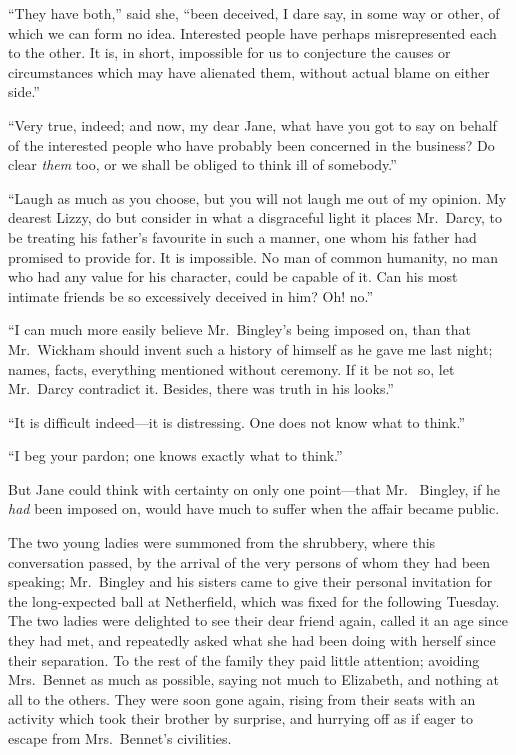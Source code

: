 ``They have both,'' said she, ``been deceived, I dare say, in some
way or other, of which we can form no idea.  Interested people
have perhaps misrepresented each to the other.  It is, in short,
impossible for us to conjecture the causes or circumstances
which may have alienated them, without actual blame on either
side.''

``Very true, indeed; and now, my dear Jane, what have you got
to say on behalf of the interested people who have probably been
concerned in the business?  Do clear \emph{them} too, or we shall be
obliged to think ill of somebody.''

``Laugh as much as you choose, but you will not laugh me out of
my opinion.  My dearest Lizzy, do but consider in what a
disgraceful light it places Mr.\ Darcy, to be treating his father's
favourite in such a manner, one whom his father had promised to
provide for.  It is impossible.  No man of common humanity, no
man who had any value for his character, could be capable of it.
Can his most intimate friends be so excessively deceived in him?
Oh! no.''

``I can much more easily believe Mr.\ Bingley's being imposed on,
than that Mr.\ Wickham should invent such a history of himself
as he gave me last night; names, facts, everything mentioned
without ceremony.  If it be not so, let Mr.\ Darcy contradict it.
Besides, there was truth in his looks.''

``It is difficult indeed---it is distressing.  One does not know what
to think.''

``I beg your pardon; one knows exactly what to think.''

But Jane could think with certainty on only one point---that Mr.\ %
Bingley, if he \emph{had} been imposed on, would have much to suffer
when the affair became public.

The two young ladies were summoned from the shrubbery,
where this conversation passed, by the arrival of the very
persons of whom they had been speaking; Mr.\ Bingley and his
sisters came to give their personal invitation for the
long-expected ball at Netherfield, which was fixed for the
following Tuesday.  The two ladies were delighted to see their
dear friend again, called it an age since they had met, and
repeatedly asked what she had been doing with herself since
their separation.  To the rest of the family they paid little
attention; avoiding Mrs.\ Bennet as much as possible, saying not
much to Elizabeth, and nothing at all to the others.  They were
soon gone again, rising from their seats with an activity which
took their brother by surprise, and hurrying off as if eager to
escape from Mrs.\ Bennet's civilities.

